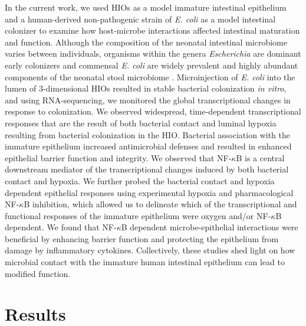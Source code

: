 \documentclass[9pt,lineo]{elife}
\begin{document}
In the current work, we used HIOs as a model immature intestinal epithelium and a human-derived non-pathogenic strain of \emph{E. coli} as a model intestinal colonizer to examine how host-microbe interactions affected intestinal maturation and function.  Although the composition of the neonatal intestinal microbiome varies between individuals, organisms within the genera \emph{Escherichia} are dominant early colonizers \citep{Gosalbes:2013,Backhed:2015} and commensal \emph{E. coli} are widely prevalent and highly abundant components of the neonatal stool microbiome \citep{Palmer:2007,Koenig:2011,Backhed:2015,Morrow:2013}. Microinjection of \emph{E. coli} into the lumen of 3-dimensional HIOs resulted in stable bacterial colonization \emph{in vitro}, and using RNA-sequencing, we monitored the global transcriptional changes in response to colonization. We observed widespread, time-dependent transcriptional responses that are the result of both bacterial contact and luminal hypoxia resulting from bacterial colonization in the HIO. Bacterial association with the immature epithelium increased antimicrobial defenses and resulted in enhanced epithelial barrier function and integrity. We observed that NF-\(\kappa\)B is a central downstream mediator of the transcriptional changes induced by both bacterial contact and hypoxia. We further probed the bacterial contact and hypoxia dependent epithelial responses using experimental hypoxia and pharmacological NF-\(\kappa\)B inhibition, which allowed us to delineate which of the transcriptional and functional responses of the immature epithelium were oxygen and/or NF-\(\kappa\)B dependent. We found that NF-\(\kappa\)B dependent microbe-epithelial interactions were beneficial by enhancing barrier function and protecting the epithelium from damage by inflammatory cytokines.  Collectively, these studies shed light on how microbial contact with the immature human intestinal epithelium can lead to modified function.

\section*{{\bfseries\sffamily } Results}
\label{sec:orgheadline10}
\end{document}
